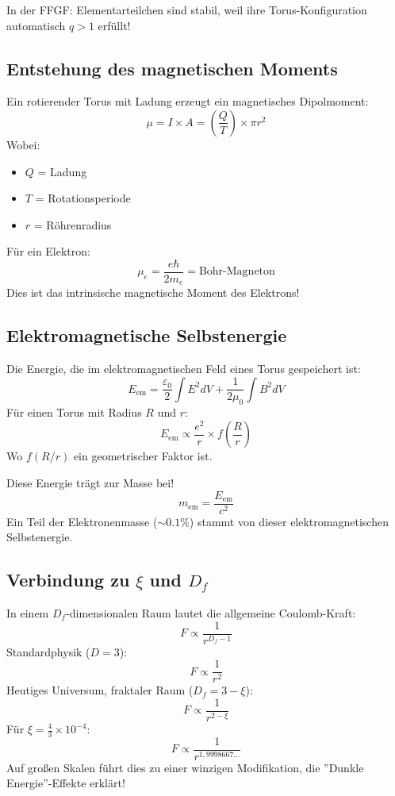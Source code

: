 	In der FFGF: Elementarteilchen sind stabil, weil ihre Torus-Konfiguration automatisch \( q > 1 \) erfüllt!
	
	\subsection{Entstehung des magnetischen Moments}
	Ein rotierender Torus mit Ladung erzeugt ein magnetisches Dipolmoment:
	\[
	\mu = I \times A = \left(\frac{Q}{T}\right) \times \pi r^2
	\]
	Wobei:
	\begin{itemize}
		\item \( Q \) = Ladung
		\item \( T \) = Rotationsperiode
		\item \( r \) = Röhrenradius
	\end{itemize}
	
	Für ein Elektron:
	\[
	\mu_e = \frac{e \hbar}{2 m_e} = \text{Bohr-Magneton}
	\]
	Dies ist das intrinsische magnetische Moment des Elektrons!
	
	\subsection{Elektromagnetische Selbstenergie}
	Die Energie, die im elektromagnetischen Feld eines Torus gespeichert ist:
	\[
	E_{\text{em}} = \frac{\varepsilon_0}{2} \int E^2 dV + \frac{1}{2\mu_0} \int B^2 dV
	\]
	Für einen Torus mit Radius \( R \) und \( r \):
	\[
	E_{\text{em}} \propto \frac{e^2}{r} \times f\left(\frac{R}{r}\right)
	\]
	Wo \( f(R/r) \) ein geometrischer Faktor ist.
	
	Diese Energie trägt zur Masse bei!
	\[
	m_{\text{em}} = \frac{E_{\text{em}}}{c^2}
	\]
	Ein Teil der Elektronenmasse (\( \sim 0.1\% \)) stammt von dieser elektromagnetischen Selbstenergie.
	
	\subsection{Verbindung zu \( \xi \) und \( D_f \)}
	In einem \(D_f\)-dimensionalen Raum lautet die allgemeine Coulomb-Kraft:
	\[
	F \propto \frac{1}{r^{D_f - 1}}
	\]
	Standardphysik (\( D = 3 \)):
	\[
	F \propto \frac{1}{r^2}
	\]
	Heutiges Universum, fraktaler Raum (\( D_f = 3 - \xi \)):
	\[
	F \propto \frac{1}{r^{2 - \xi}}
	\]
	Für \( \xi = \frac{4}{3} \times 10^{-4} \):
	\[
	F \propto \frac{1}{r^{1{,}9998667\ldots}}
	\]
	Auf großen Skalen führt dies zu einer winzigen Modifikation, die ''Dunkle Energie''-Effekte erklärt!

